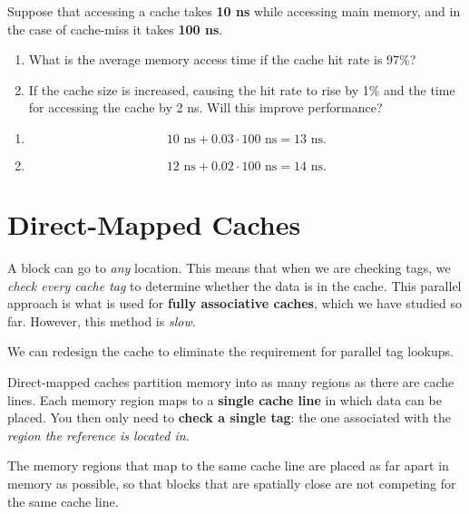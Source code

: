 \begin{problem}
  Suppose that accessing a cache takes \textbf{10 ns} while accessing main memory, and in the case of cache-miss it takes \textbf{100 ns}.
  \begin{enumerate}[label=\alph*]
    \item What is the average memory access time if the cache hit rate is 97\%?  
    \item If the cache size is increased, causing the hit rate to rise by 1\% and the time for accessing the cache by 2 ns. Will this improve performance?
  \end{enumerate}
\end{problem}
\begin{answer} \:
  \begin{enumerate}[label=\alph*]
    \item 
    \[
      10 \text{ ns} + 0.03 \cdot 100 \text{ ns} = 13 \text{ ns}.
    \]
    \item
    \[
      12 \text{ ns} + 0.02 \cdot 100 \text{ ns} = 14 \text{ ns}.
    \]
  \end{enumerate}
\end{answer}

\newpage

\section{Direct-Mapped Caches}
A block can go to \emph{any} location. This means that when we are checking tags, we \emph{check every cache tag} to determine whether the data is in the cache. This parallel approach is what is used for \textbf{fully associative caches}, which we have studied so far. However, this method is \emph{slow}. \par

We can redesign the cache to eliminate the requirement for parallel tag lookups.
\begin{definition}
  Direct-mapped caches partition memory into as many regions as there are cache lines. Each memory region maps to a \textbf{single cache line} in which data can be placed. You then only need to \textbf{check a single tag}: the one associated with the \emph{region the reference is located in}. 
\end{definition}
\begin{remark}
  The memory regions that map to the same cache line are placed as far apart in memory as possible, so that blocks that are spatially close are not competing for the same cache line.
\end{remark}

